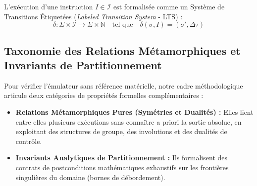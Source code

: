 \documentclass[10pt,journal,compsoc]{IEEEtran}
\begin{document}
L'exécution d'une instruction $I \in \mathcal{I}$ est formalisée comme un Système de Transitions Étiquetées (\textit{Labeled Transition System} - LTS) :
\begin{equation}
\delta : \Sigma \times \mathcal{I} \to \Sigma \times \mathbb{N} \quad \text{tel que} \quad \delta(\sigma, I) = (\sigma', \Delta \tau)
\end{equation}

\subsection{Taxonomie des Relations Métamorphiques et Invariants de Partitionnement}
Pour vérifier l'émulateur sans référence matérielle, notre cadre méthodologique articule deux catégories de propriétés formelles complémentaires :
\begin{itemize}
    \item \textbf{Relations Métamorphiques Pures (Symétries et Dualités) :} Elles lient entre elles plusieurs exécutions sans connaître a priori la sortie absolue, en exploitant des structures de groupe, des involutions et des dualités de contrôle.
    \item \textbf{Invariants Analytiques de Partitionnement :} Ils formalisent des contrats de postconditions mathématiques exhaustifs sur les frontières singulières du domaine (bornes de débordement).
\end{itemize}
\end{document}
